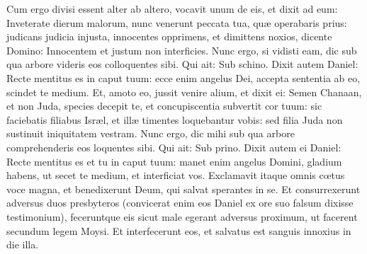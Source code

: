 {{ Cum ergo divisi essent alter ab altero, vocavit unum de eis, et dixit ad eum: Inveterate dierum malorum, nunc venerunt peccata tua, quæ operabaris prius:
 judicans judicia injusta, innocentes opprimens, et dimittens noxios, dicente Domino: Innocentem et justum non interficies.
 Nunc ergo, si vidisti eam, dic sub qua arbore videris eos colloquentes sibi. Qui ait: Sub schino.
 Dixit autem Daniel: Recte mentitus es in caput tuum: ecce enim angelus Dei, accepta sententia ab eo, scindet te medium.
 Et, amoto eo, jussit venire alium, et dixit ei: Semen Chanaan, et non Juda, species decepit te, et concupiscentia subvertit cor tuum:
 sic faciebatis filiabus Isræl, et illæ timentes loquebantur vobis: sed filia Juda non sustinuit iniquitatem vestram.
 Nunc ergo, dic mihi sub qua arbore comprehenderis eos loquentes sibi. Qui ait: Sub prino.
 Dixit autem ei Daniel: Recte mentitus es et tu in caput tuum: manet enim angelus Domini, gladium habens, ut secet te medium, et interficiat vos.
 Exclamavit itaque omnis cœtus voce magna, et benedixerunt Deum, qui salvat sperantes in se.
 Et consurrexerunt adversus duos presbyteros (convicerat enim eos Daniel ex ore suo falsum dixisse testimonium), feceruntque eis sicut male egerant adversus proximum,
 ut facerent secundum legem Moysi. Et interfecerunt eos, et salvatus est sanguis innoxius in die illa.
  }
  }
